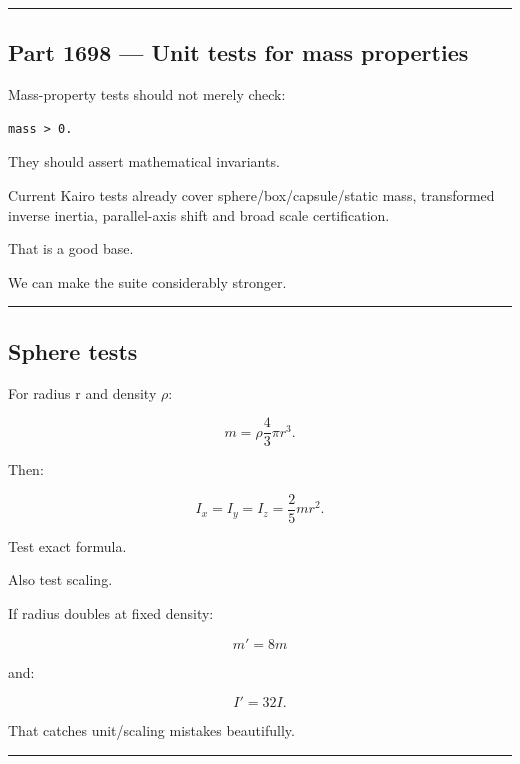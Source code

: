 \begin{center}\rule{0.5\linewidth}{0.5pt}\end{center}

\subsection{Part 1698 --- Unit tests for mass properties}\label{06-engine-ii-ch039-part-1698-unit-tests-for-mass-properties}

\hypertarget{06-engine-ii-ch039-part-1698-unit-tests-for-mass-properties}{}

Mass-property tests should not merely check:

\begin{verbatim}
mass > 0.
\end{verbatim}

They should assert mathematical invariants.

Current Kairo tests already cover sphere/box/capsule/static mass, transformed inverse inertia, parallel-axis shift and broad scale certification.

That is a good base.

We can make the suite considerably stronger.

\begin{center}\rule{0.5\linewidth}{0.5pt}\end{center}

\subsection{Sphere tests}\label{06-engine-ii-ch039-sphere-tests}

\hypertarget{06-engine-ii-ch039-sphere-tests}{}

For radius r and density \(\rho\):

\[
m
=
\rho
\frac43\pi r^3.
\]

Then:

\[
I_x=I_y=I_z
=
\frac25mr^2.
\]

Test exact formula.

Also test scaling.

If radius doubles at fixed density:

\[
m'=
8m
\]

and:

\[
I'=
32I.
\]

That catches unit/scaling mistakes beautifully.

\begin{center}\rule{0.5\linewidth}{0.5pt}\end{center}

